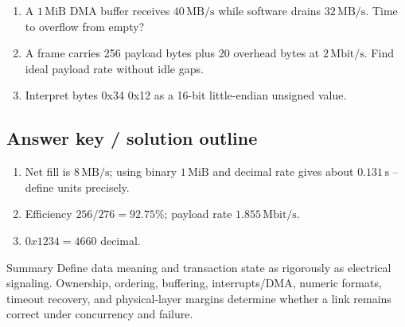 \documentclass[10pt,letterpaper]{article}
\begin{document}
\begin{enumerate}
  \item A $1\,\mathrm{MiB}$ DMA buffer receives $40\,\mathrm{MB/s}$ while software drains $32\,\mathrm{MB/s}$. Time to overflow from empty?
  \item A frame carries 256 payload bytes plus 20 overhead bytes at $2\,\mathrm{Mbit/s}$. Find ideal payload rate without idle gaps.
  \item Interpret bytes 0x34 0x12 as a 16-bit little-endian unsigned value.
\end{enumerate}\subsection{Answer key / solution outline}
\begin{enumerate}
  \item Net fill is $8\,\mathrm{MB/s}$; using binary $1\,\mathrm{MiB}$ and decimal rate gives about $0.131\,\mathrm{s}$ -- define units precisely.
  \item Efficiency $256/276=92.75\%$; payload rate $1.855\,\mathrm{Mbit/s}$.
  \item $0x1234=4660$ decimal.
\end{enumerate}\begin{CornellSummaryBox}{Summary}
Define data meaning and transaction state as rigorously as electrical signaling. Ownership, ordering, buffering, interrupts/DMA, numeric formats, timeout recovery, and physical-layer margins determine whether a link remains correct under concurrency and failure.
\end{CornellSummaryBox}
\end{document}
